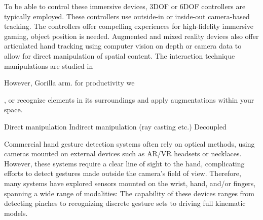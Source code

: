 \documentclass [11pt, proquest] {uwthesis}[2020/02/24]
\begin{document}
To be able to control these immersive devices, 3DOF or 6DOF controllers are typically employed. These controllers use outside-in or inside-out camera-based tracking. The controllers offer compelling experiences for high-fidelity immersive gaming,  object position is needed. Augmented and mixed reality devices also offer articulated hand tracking using computer vision on depth or camera data to allow for direct manipulation of spatial content. The interaction technique manipulations are studied in 

However,
Gorilla arm.
for productivity we 

, or recognize elements in its surroundings and apply augmentations within your space.




Direct manipulation
Indirect manipulation (ray casting etc.)
Decoupled 


Commercial hand gesture detection systems \cite{microsoft, MetaStore, TrackingUltraleap} often rely on optical methods, using cameras mounted on external devices such as AR/VR headsets or necklaces. However, these systems require a clear line of sight to the hand, complicating efforts to  detect gestures made outside the camera's field of view.
Therefore, many systems have explored sensors mounted on the wrist, hand, and/or fingers, spanning a wide range of modalities: 
The capability of these devices ranges from detecting pinches to recognizing discrete gesture sets to driving full kinematic models.
\end{document}
